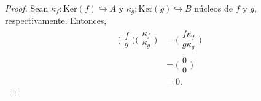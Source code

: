 \documentclass[tesis]{subfiles}
\begin{document}
\begin{proof}
    Sean $\kappa_f:\text{Ker}(f)\hookrightarrow A$ y $\kappa_g:\text{Ker}(g)\hookrightarrow B$ núcleos de $f$ y $g$, respectivamente. Entonces,
    \begin{align*}
        \big(\begin{smallmatrix} f \\ g \end{smallmatrix}\big)\big(\begin{smallmatrix} \kappa_f \\ \kappa_g \end{smallmatrix}\big) &= \big(\begin{smallmatrix} f\kappa_f \\ g\kappa_g \end{smallmatrix}\big) \\
                                                                                                                                   &= \big(\begin{smallmatrix} 0 \\ 0 \end{smallmatrix}\big) \\
                                                               &= 0.
    \end{align*}

\end{proof}
\end{document}
